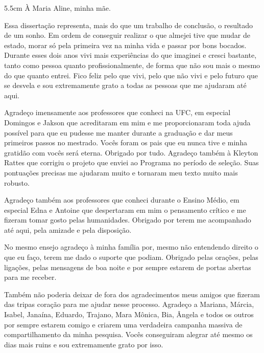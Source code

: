 \documentclass[
	12pt,				%
	oneside,			%
	a4paper,			%
	sumario=tradicional,
	english,			%
	brazil				%
	]{abntex2}
\begin{document}
\begin{dedicatoria}
	\vspace*{\fill}
	\noindent
	\begin{adjustwidth*}{}{5.5cm} 
		\raggedleft       
		À Maria Aline, minha mãe.
	\end{adjustwidth*}
\end{dedicatoria}

\begin{agradecimentos}
	Essa dissertação representa, mais do que um trabalho de conclusão, o resultado de um sonho. Em ordem de conseguir realizar o que almejei tive que mudar de estado, morar só pela primeira vez na minha vida e passar por bons bocados. Durante esses dois anos vivi mais experiências do que imaginei e cresci bastante, tanto como pessoa quanto profissionalmente, de forma que não sou mais o mesmo do que quanto entrei. Fico feliz pelo que vivi, pelo que não vivi e pelo futuro que se desvela e sou extremamente grato a todas as pessoas que me ajudaram até aqui.

 Agradeço imensamente aos professores que conheci na UFC, em especial Domingos e Jakson que acreditaram em mim e me proporcionaram toda ajuda possível para que eu pudesse me manter durante a graduação e dar meus primeiros passos no mestrado. Vocês foram os pais que eu nunca tive e minha gratidão com vocês será eterna. Obrigado por tudo. Agradeço também à Kleyton Rattes que corrigiu o projeto que enviei ao Programa no período de seleção. Suas pontuações precisas me ajudaram muito e tornaram meu texto muito mais robusto.

 Agradeço também aos professores que conheci durante o Ensino Médio, em especial Edna e Antoine que despertaram em mim o pensamento crítico e me fizeram tomar gosto pelas humanidades. Obrigado por terem me acompanhado até aqui, pela amizade e pela disposição.

 No mesmo ensejo agradeço à minha família por, mesmo não entendendo direito o que eu faço, terem me dado o suporte que podiam. Obrigado pelas orações, pelas ligações, pelas mensagens de boa noite e por sempre estarem de portas abertas para me receber.

 Também não poderia deixar de fora dos agradecimentos meus amigos que fizeram das tripas coração para me ajudar nesse processo. Agradeço a Mariana, Márcia, Isabel, Janaína, Eduardo, Trajano, Mara Mônica, Bia, Ângela e todos os outros por sempre estarem comigo e criarem uma verdadeira campanha massiva de compartilhamento da minha pesquisa. Vocês conseguiram alegrar até mesmo os dias mais ruins e sou extremamente grato por isso.


\end{agradecimentos}
\end{document}
